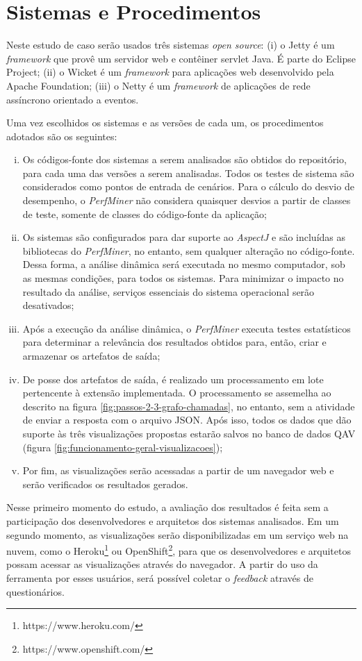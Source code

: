 \section{Sistemas e Procedimentos} \label{sec:sistemas-procedimentos}

Neste estudo de caso serão usados três sistemas \textit{open source}: (i) o Jetty \cite{Jetty2016} é um \textit{framework} que provê um servidor web e contêiner servlet Java. É parte do Eclipse Project; (ii) o Wicket \cite{ApacheWi} é um \textit{framework} para aplicações web desenvolvido pela Apache Foundation; (iii) o Netty \cite{Netty2016} é um \textit{framework} de aplicações de rede assíncrono orientado a eventos.

Uma vez escolhidos os sistemas e as versões de cada um, os procedimentos adotados são os seguintes:
\begin{enumerate}[(i)]
	\item Os códigos-fonte dos sistemas a serem analisados são obtidos do repositório, para cada uma das versões a serem analisadas. Todos os testes de sistema são considerados como pontos de entrada de cenários. Para o cálculo do desvio de desempenho, o \textit{PerfMiner} não considera quaisquer desvios a partir de classes de teste, somente de classes do código-fonte da aplicação;
	\item Os sistemas são configurados para dar suporte ao \textit{AspectJ} e são incluídas as bibliotecas do \textit{PerfMiner}, no entanto, sem qualquer alteração no código-fonte. Dessa forma, a análise dinâmica será executada no mesmo computador, sob as mesmas condições, para todos os sistemas. Para minimizar o impacto no resultado da análise, serviços essenciais do sistema operacional serão desativados;
	\item Após a execução da análise dinâmica, o \textit{PerfMiner} executa testes estatísticos para determinar a relevância dos resultados obtidos para, então, criar e armazenar os artefatos de saída;
	\item De posse dos artefatos de saída, é realizado um processamento em lote pertencente à extensão implementada. O processamento se assemelha ao descrito na figura \ref{fig:passos-2-3-grafo-chamadas}, no entanto, sem a atividade de enviar a resposta com o arquivo JSON. Após isso, todos os dados que dão suporte às três visualizações propostas estarão salvos no banco de dados QAV (figura \ref{fig:funcionamento-geral-visualizacoes});
	\item Por fim, as visualizações serão acessadas a partir de um navegador web e serão verificados os resultados gerados.
\end{enumerate}

Nesse primeiro momento do estudo, a avaliação dos resultados é feita sem a participação dos desenvolvedores e arquitetos dos sistemas analisados. Em um segundo momento, as visualizações serão disponibilizadas em um serviço web na nuvem, como o Heroku\footnote{https://www.heroku.com/} ou OpenShift\footnote{https://www.openshift.com/}, para que os desenvolvedores e arquitetos possam acessar as visualizações através do navegador. A partir do uso da ferramenta por esses usuários, será possível coletar o \textit{feedback} através de questionários.